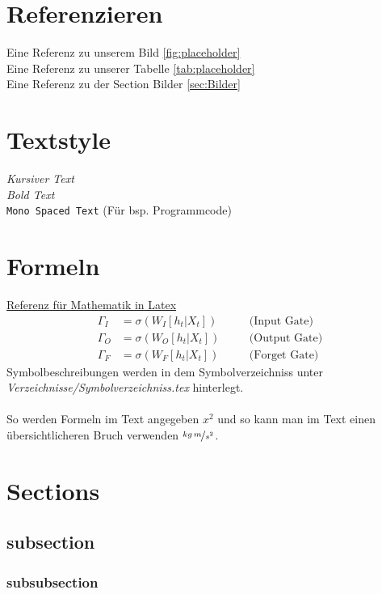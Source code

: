 \section{Referenzieren}
\label{sec:Referenzieren}
%
Eine Referenz zu unserem Bild \ref{fig:placeholder}\\
Eine Referenz zu unserer Tabelle \ref{tab:placeholder}\\
Eine Referenz zu der Section Bilder \ref{sec:Bilder}
%
%
\section{Textstyle}
\label{sec:Textstyle}
%
\textit{Kursiver Text}\\
\textit{Bold Text}\\
\texttt{Mono Spaced Text} (Für bsp. Programmcode)
%
%
\section{Formeln}
\label{sec:Formeln}
%
\href{https://en.wikibooks.org/wiki/LaTeX/Mathematics}{Referenz für Mathematik in Latex}
%
\begin{align}
	\label{eq:input_gate}
	\Gamma_I &= \sigma\left(W_{I}\left[h_t|X_t\right]\right)&&\quad\text{(Input Gate)}\\
	\label{eq:output_gate}
	\Gamma_O &= \sigma\left(W_{O}\left[h_t|X_t\right]\right)&&\quad\text{(Output Gate)}\\
	\label{eq:forget_gate}
	\Gamma_F &= \sigma\left(W_{F}\left[h_t|X_t\right]\right)&&\quad\text{(Forget Gate)}
\end{align}
%
Symbolbeschreibungen werden in dem Symbolverzeichniss unter \textit{Verzeichnisse/Symbolverzeichniss.tex} hinterlegt.\\\\
%
So werden Formeln im Text angegeben $x^2$ und so kann man im Text einen übersichtlicheren Bruch verwenden $\nicefrac{kg\,m}{s^2}$.
%
%
\section{Sections}
\label{sec:sections}
%
\subsection{subsection}
\label{subsec:subsection}
%
\subsubsection{subsubsection}
\label{subsubsec:subsubsection}
%
%
